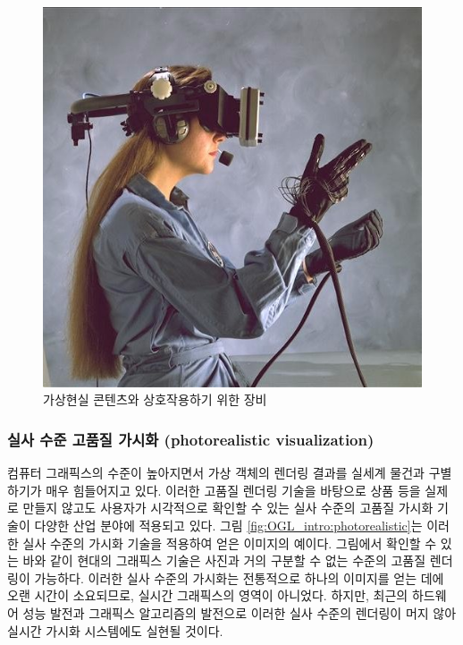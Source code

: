 \begin{figure}[h!]
  \centering
    \includegraphics[width=13cm]{OGL_intro/virtualRealityHMD.jpg}
    \caption{가상현실 콘텐츠와 상호작용하기 위한 장비}
    \label{fig:OGL_intro:VRHMD}
\end{figure}

\subsubsection{실사 수준 고품질 가시화 (photorealistic visualization)}

컴퓨터 그래픽스의 수준이 높아지면서 가상 객체의 렌더링 결과를 실세계 물건과 구별하기가 매우 힘들어지고 있다. 이러한 고품질 렌더링 기술을 바탕으로 상품 등을 실제로 만들지 않고도 사용자가 시각적으로 확인할 수 있는 실사 수준의 고품질 가시화 기술이 다양한 산업 분야에 적용되고 있다. 그림 \ref{fig:OGL_intro:photorealistic}는 이러한 실사 수준의 가시화 기술을 적용하여 얻은 이미지의 예이다. 그림에서 확인할 수 있는 바와 같이 현대의 그래픽스 기술은 사진과 거의 구분할 수 없는 수준의 고품질 렌더링이 가능하다. 이러한 실사 수준의 가시화는 전통적으로 하나의 이미지를 얻는 데에 오랜 시간이 소요되므로, 실시간 그래픽스의 영역이 아니었다. 하지만, 최근의 하드웨어 성능 발전과 그래픽스 알고리즘의 발전으로 이러한 실사 수준의 렌더링이 머지 않아 실시간 가시화 시스템에도 실현될 것이다.

